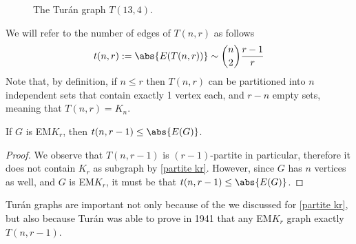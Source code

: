 \documentclass[a4paper, 12pt]{report}
\begin{document}
\begin{figure}[H]
{
        }
        \caption{The Turán graph $T(13,4)$.}
    \end{figure}

    We will refer to the number of edges of $T(n, r)$ as follows $$t(n, r) := \abs{E(T(n, r))} \sim \binom{n}{2} \dfrac{ r- 1}{r}$$ Note that, by definition, if $n \le r$ then $T(n, r)$ can be partitioned into $n$ independent sets that contain exactly 1 vertex each, and $r - n$ empty sets, meaning that $T(n, r) = K_n$.


    \begin{framedprop}[label={turan bound}]{}
        If $G$ is EM$K_r$, then $t(n, r - 1) \le \abs{E(G)}$.
    \end{framedprop}
    
    \begin{proof}
        We observe that $T(n, r - 1)$ is $(r - 1)$-partite in particular, therefore it does not contain $K_r$ as subgraph by \cref{partite kr}. However, since $G$ has $n$ vertices as well, and $G$ is EM$K_r$, it must be that $t(n , r - 1) \le \abs{E(G)}$.
    \end{proof}

    Turán graphs are important not only because of the  we discussed for \cref{partite kr}, but also because Turán was able to prove in 1941 \cite{turan} that any EM$K_r$ graph  exactly $T(n, r- 1)$.
    
\end{document}
